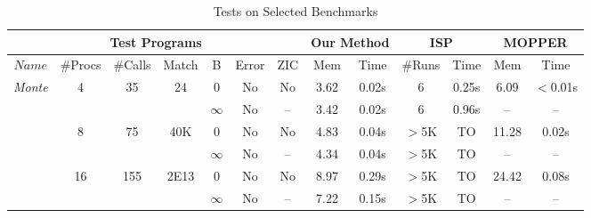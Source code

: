 \begin{savenotes}
\begin{table*}[t]
\begin{center}
\scriptsize
\caption{Tests on Selected Benchmarks}\label{table:benchmarks}
     \begin{threeparttable}
\begin{tabular}{|c|c|c|c|c|c|c||c|c||c|c||c|c|}
		\hline
         \multicolumn{7}{|c||}{Test Programs} & \multicolumn{2}{c||}{Our Method} & \multicolumn{2}{c||}{ISP} & \multicolumn{2}{c|}{MOPPER}  \\ \hline
          $Name$ & \#Procs & \#Calls&Match&B&Error & ZIC &Mem & Time &\#Runs&Time & Mem & Time\\ \hline
          \multirow{6}{*}{\textit{Monte}} & \multirow{2}{*}{4} & \multirow{2}{*}{35} &  \multirow{2}{*}{24} 
          												     & 0 & No & No\tnote{\textdagger} & 3.62 & 0.02s & 6 & 0.25s & 6.09 & $<$0.01s\\ \cline{5-13}
          						       &                            & &  &  $\infty$ & No & -- & 3.42 & 0.02s & 6 & 0.96s &  -- & --\\ \cline{2-13}
						       		& \multirow{2}{*}{8} & \multirow{2}{*}{75} &  \multirow{2}{*}{40K} 
          												     & 0 & No & No\tnote{\textdagger} & 4.83 & 0.04s & $>$5K & TO & 11.28 & 0.02s\\ \cline{5-13}
          						       &                            & &  &  $\infty$ & No & -- & 4.34 & 0.04s & $>$5K & TO &  -- & --\\ \cline{2-13}
						              & \multirow{2}{*}{16} & \multirow{2}{*}{155} &  \multirow{2}{*}{2E13} 
          												     & 0 & No & No\tnote{\textdagger} & 8.97 & 0.29s & $>$5K & TO & 24.42 & 0.08s\\ \cline{5-13}
          						       &                            & &  &  $\infty$ & No & -- & 7.22 & 0.15s & $>$5K & TO & --  & --\\ \hline
						       \hline
						       

\end{tabular}
\end{threeparttable}
\end{center}
\end{table*}
\end{savenotes}
